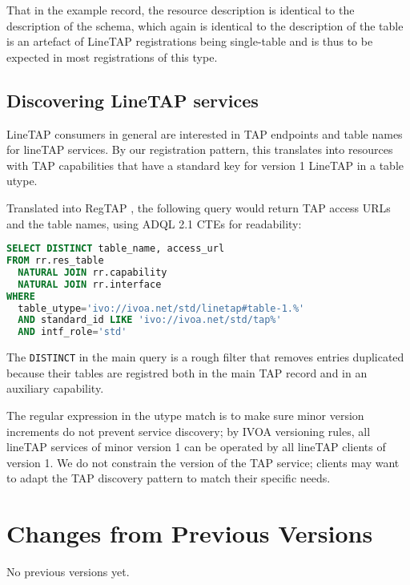 \documentclass[11pt,a4paper]{ivoa}
\begin{document}
That in the example record, the resource description is identical to the
description of the schema, which again is identical to the description
of the table is an artefact of LineTAP registrations being single-table
and is thus to be expected in most registrations of this type.


\subsection{Discovering LineTAP services}

LineTAP consumers in general are interested in TAP endpoints and table names for
lineTAP services.  By our registration pattern, this translates into
resources with TAP capabilities that have a standard key for version 1
LineTAP in a table utype.

Translated into RegTAP \citep{2019ivoa.spec.1011D}, the following query
would return TAP access URLs and the table names, using ADQL 2.1 CTEs
for readability:

\begin{lstlisting}[language=SQL]
SELECT DISTINCT table_name, access_url
FROM rr.res_table
  NATURAL JOIN rr.capability
  NATURAL JOIN rr.interface
WHERE
  table_utype='ivo://ivoa.net/std/linetap#table-1.%'
  AND standard_id LIKE 'ivo://ivoa.net/std/tap%'
  AND intf_role='std'
\end{lstlisting}

The \texttt{DISTINCT} in the main query is a rough filter that removes
entries duplicated because their tables are registred both in the main
TAP record and in an auxiliary capability.  

The regular expression in the utype match is to make sure minor version
increments do not prevent service discovery; by IVOA versioning rules,
all lineTAP services of minor version 1 can be operated by all lineTAP
clients of version 1.  We do not constrain the version of the TAP
service; clients may want to adapt the TAP discovery pattern to match
their specific needs.



\appendix
\section{Changes from Previous Versions}

No previous versions yet.



\end{document}
